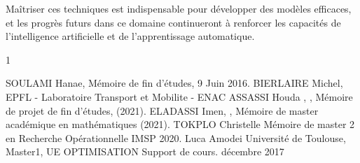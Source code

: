 \documentclass[12pt,a4paper,openay]{book}
\numberwithin{equation}{chapter}
\begin{document}
	Ma\^itriser ces techniques est indispensable pour d\'evelopper des mod\`eles efficaces, et les progr\`es futurs dans ce domaine continueront \`a renforcer les capacit\'es de l'intelligence artificielle et de l'apprentissage automatique.
	
	\def\cprime{$'$}
	\newpage
	\begin{thebibliography}{1}
	
	 SOULAMI Hanae,
	\newblock M\'emoire de fin d'\'etudes,
	 9 Juin 2016.
	\newblock BIERLAIRE Michel, 
	 EPFL - Laboratoire Transport et Mobilite - ENAC 
	\newblock ASSASSI Houda ,
	, Mémoire de projet de fin d'études, (2021).
	\newblock ELADASSI Imen,
	, Mémoire de master académique en mathématiques (2021). 
	\newblock TOKPLO Christelle 
	 Mémoire de master 2 en Recherche Opérationnelle IMSP 2020.
	\newblock Luca Amodei 
	\newblock Université de Toulouse, Master1, UE OPTIMISATION Support de cours.
	 décembre 2017
\end{thebibliography}
	
\end{document}
